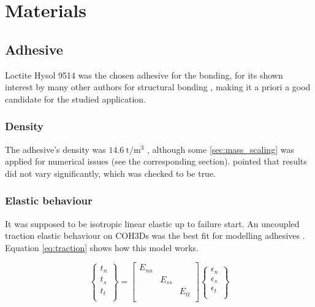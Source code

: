 \section{Materials}

\subsection{Adhesive}
Loctite Hysol 9514 was the chosen adhesive for the bonding, for its shown interest by many other authors for structural bonding \citep{Sadowski2010, Scatina2011, SernaMoreno2015}, making it a priori a good candidate for the studied application.

\subsubsection{Density}
The adhesive's density was $\SI{14.6}{\tonne/\m^3}$ \citep{manufCatalog}, although some \ref{sec:mass_scaling} was applied for numerical issues (see the corresponding section). \citet{Scattina2011} pointed that results did not vary significantly, which was checked to be true.  %

\subsubsection{Elastic behaviour}
\label{sec:elastic}
It was supposed to be isotropic linear elastic \citep{SernaMoreno2015} up to failure start. An uncoupled traction elastic behaviour \citep{Sadowski2010, Sadowski2011, Scattina2011, Sadowski2014} on \glspl{COH3D} was the best fit for modelling adhesives \citep{Abaqus613Manual}. Equation \ref{eq:traction} shows how this model works.

\begin{equation}
\label{eq:traction}
\begin{Bmatrix}
 t_n \\
 t_s \\
 t_t \\
\end{Bmatrix}
 =
\begin{bmatrix}
 E_{nn} & & \\
 & E_{ss} & \\
 & & E_{tt} \\
\end{bmatrix}
\begin{Bmatrix}
 \epsilon_n \\
 \epsilon_s \\
 \epsilon_t \\
\end{Bmatrix}
\end{equation}

